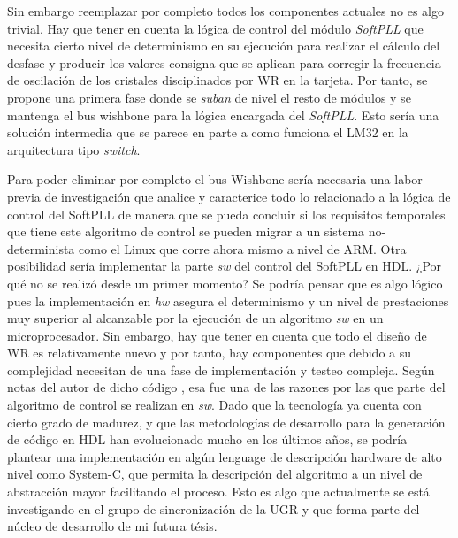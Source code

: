 
Sin embargo reemplazar por completo todos los componentes actuales no es algo 
trivial. Hay que tener en cuenta la lógica de control del módulo 
\textit{SoftPLL} que necesita cierto nivel de determinismo en su ejecución para 
realizar el cálculo del desfase y producir los valores consigna que se aplican 
para corregir la frecuencia de oscilación de los cristales disciplinados por WR 
en la tarjeta. Por tanto, se propone una primera fase donde se \textit{suban} 
de nivel el resto de módulos y se mantenga el bus wishbone para la lógica 
encargada del \textit{SoftPLL}. Esto sería una solución intermedia que se 
parece en parte a como funciona el LM32 en la arquitectura tipo \textit{switch}.

Para poder eliminar por completo el bus Wishbone sería necesaria una labor 
previa de investigación que analice y caracterice todo lo relacionado a la 
lógica de control del SoftPLL de manera que se pueda concluir si los requisitos 
temporales que tiene este algoritmo de control se pueden migrar a un sistema 
no-determinista como el Linux que corre ahora mismo a nivel de ARM. Otra 
posibilidad sería implementar la parte \textit{sw} del control del SoftPLL en 
HDL. ¿Por qué no se realizó desde un primer momento? Se podría pensar que es 
algo lógico pues la implementación en \textit{hw} asegura el determinismo y un 
nivel de prestaciones muy superior al alcanzable por la ejecución de un 
algoritmo \textit{sw} en un microprocesador. Sin embargo, hay que tener en 
cuenta que todo el diseño de WR es relativamente nuevo y por tanto, hay 
componentes que debido a su complejidad necesitan de una fase de implementación 
y testeo compleja. Según notas del autor de dicho código , esa fue una de las razones por las que parte del algoritmo de 
control se realizan en \textit{sw}. Dado que la tecnología ya cuenta con cierto 
grado de madurez, y que las metodologías de desarrollo para la generación de 
código en HDL han evolucionado mucho en los últimos años, se podría plantear 
una implementación en algún lenguage de descripción hardware de alto nivel como 
System-C, que permita la descripción del algoritmo a un nivel de abstracción 
mayor facilitando el proceso. Esto es algo que actualmente se está investigando 
en el grupo de sincronización de la UGR y que forma parte del núcleo de 
desarrollo de mi futura tésis.

